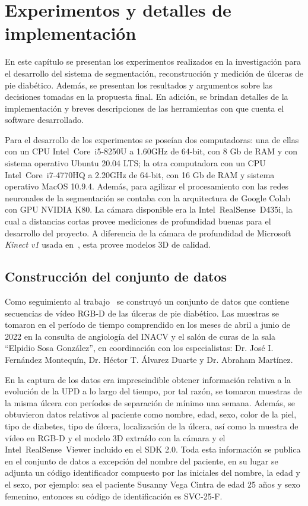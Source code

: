 \chapter{Experimentos y detalles de implementación}\label{chapter:implementation}

En este capítulo se presentan los experimentos realizados en la investigación para el desarrollo del sistema de segmentación, reconstrucción y medición de úlceras de pie diabético. Además, se presentan los resultados y argumentos sobre las decisiones tomadas en la propuesta final. En adición, se brindan detalles de la implementación y breves descripciones de las herramientas con que cuenta el software desarrollado.

Para el desarrollo de los experimentos se poseían dos computadoras: una de ellas con un CPU Intel\textregistered~Core\texttrademark~i5-8250U a 1.60GHz de 64-bit, con 8 Gb de RAM y con sistema operativo Ubuntu 20.04 LTS; la otra computadora con un CPU Intel\textregistered~Core\texttrademark~i7-4770HQ a 2.20GHz de 64-bit, con 16 Gb de RAM y sistema operativo MacOS 10.9.4. Además, para agilizar el procesamiento con las redes neuronales de la segmentación se contaba con la arquitectura de Google Colab con GPU NVIDIA K80. La cámara disponible era la Intel\textregistered~RealSense\texttrademark~D435i, la cual a distancias cortas provee mediciones de profundidad buenas para el desarrollo del proyecto. A diferencia de la cámara de profundidad de Microsoft \textit{Kinect v1} usada en~\cite{ching2022segm3d}, esta provee modelos 3D de calidad.

\section{Construcción del conjunto de datos}\label{sec:dataset}

Como seguimiento al trabajo~\cite{ching2022segm3d} se construyó un conjunto de datos que contiene secuencias de vídeo RGB-D de las úlceras de pie diabético. Las muestras se tomaron en el período de tiempo comprendido en los meses de abril a junio de 2022 en la consulta de angiología del INACV y el salón de curas de la sala ``Elpidio Sosa González'', en coordinación con los especialistas: Dr. José I. Fernández Montequín, Dr. Héctor T. Álvarez Duarte y Dr. Abraham Martínez.

En la captura de los datos era imprescindible obtener información relativa a la evolución de la UPD a lo largo del tiempo, por tal razón, se tomaron muestras de la misma úlcera con períodos de separación de mínimo una semana. Además, se obtuvieron datos relativos al paciente como nombre, edad, sexo, color de la piel, tipo de diabetes, tipo de úlcera, localización de la úlcera, así como la muestra de vídeo en RGB-D y el modelo 3D extraído con la cámara y el Intel\textregistered~RealSense\texttrademark~Viewer incluido en el SDK 2.0. Toda esta información se publica en el conjunto de datos a excepción del nombre del paciente, en su lugar se adjunta un código identificador compuesto por las iniciales del nombre, la edad y el sexo, por ejemplo: sea el paciente Susanny Vega Cintra de edad 25 años y sexo femenino, entonces su código de identificación es SVC-25-F.

